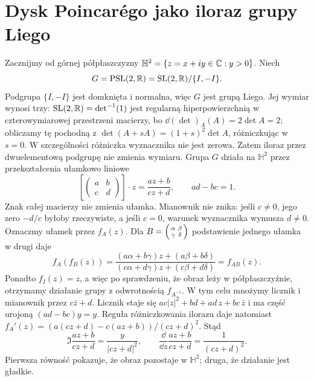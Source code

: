 \section{Dysk Poincarégo jako iloraz grupy Liego}
\label{sec:klein-dysk}

\begin{przyklad}
\label{prz:klein-dysk}
Zacznijmy od górnej półpłaszczyzny
$\mathbb H^2=\{z=x+iy\in\mathbb{C}:y>0\}$. Niech
\[
 G=\mathrm{PSL}(2,\mathbb{R})
 =\mathrm{SL}(2,\mathbb{R})/\{I,-I\}.
\]
Podgrupa $\{I,-I\}$ jest domknięta i normalna,
więc $G$ jest grupą Liego. Jej wymiar wynosi trzy:
$\mathrm{SL}(2,\mathbb{R})=\det^{-1}(1)$ jest regularną
hiperpowierzchnią w czterowymiarowej przestrzeni
macierzy, bo $\dd(\det)_A(A)=2\det A=2$;
obliczamy tę pochodną z
$\det(A+sA)=(1+s)^2\det A$, różniczkując w $s=0$.
W szczególności różniczka wyznacznika nie jest zerowa.
Zatem
iloraz przez dwuelementową podgrupę
nie zmienia wymiaru. Grupa $G$ działa na
$\mathbb H^2$ przez przekształcenia ułamkowo liniowe
\[
 \left[\begin{pmatrix}a&b\\c&d\end{pmatrix}\right]
 \cdot z=\frac{az+b}{cz+d},\qquad ad-bc=1.
\]
Znak całej macierzy nie zmienia ułamka. Mianownik
nie znika: jeśli $c\ne0$, jego zero $-d/c$ byłoby rzeczywiste,
a jeśli $c=0$, warunek wyznacznika wymusza $d\ne0$.
Oznaczmy ułamek przez $f_A(z)$.
Dla $B=\begin{psmallmatrix}\alpha&\beta\\\gamma&\delta\end{psmallmatrix}$
podstawienie jednego ułamka w drugi daje
\[
 f_A(f_B(z))
 =\frac{(a\alpha+b\gamma)z+(a\beta+b\delta)}
        {(c\alpha+d\gamma)z+(c\beta+d\delta)}
 =f_{AB}(z).
\]
Ponadto $f_I(z)=z$, a więc po sprawdzeniu, że obraz leży
w półpłaszczyźnie, otrzymamy działanie grupy z odwrotnością
$f_{A^{-1}}$.
W tym celu mnożymy licznik i mianownik przez
$c\bar z+d$. Licznik staje się
$ac|z|^2+bd+ad\,z+bc\,\bar z$ i ma część urojoną
$(ad-bc)y=y$. Reguła różniczkowania ilorazu daje natomiast
$f_A'(z)=(a(cz+d)-c(az+b))/(cz+d)^2$.
Stąd
\begin{equation}\label{eq:klein-mobius-pochodna}
 \Im\frac{az+b}{cz+d}=\frac{y}{|cz+d|^2},
 \qquad
 \frac{\dd}{\dd z}\frac{az+b}{cz+d}
 =\frac1{(cz+d)^2}.
\end{equation}
Pierwsza równość pokazuje, że obraz pozostaje w
$\mathbb H^2$; druga, że działanie jest gładkie.


\end{przyklad}
